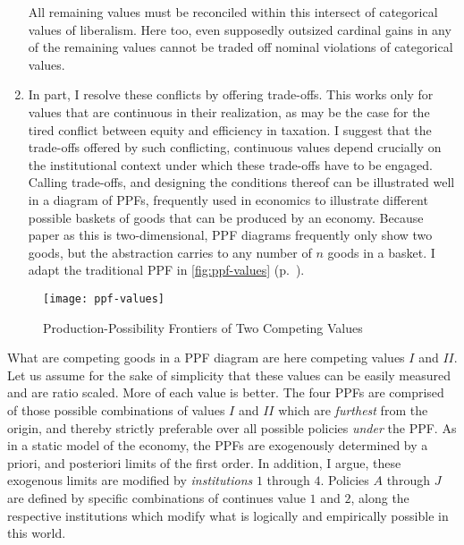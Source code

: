 \begin{enumerate}
		All remaining values must be reconciled within this intersect of categorical values of liberalism.
		Here too, even supposedly outsized cardinal gains in any of the remaining values cannot be traded off nominal violations of categorical values.
	\item
		In part, I resolve these conflicts by offering trade-offs.
		This works only for values that are continuous in their realization, as may be the case for the tired conflict between equity and efficiency in taxation. %
		I suggest that the trade-offs offered by such conflicting, continuous values depend crucially on the institutional context under which these trade-offs have to be engaged.
		Calling trade-offs, and designing the conditions thereof can be illustrated well in a diagram of \glspl{PPF}, frequently used in economics to illustrate different possible baskets of goods that can be produced by an economy. 
		Because paper as this is two-dimensional, \gls{PPF} diagrams frequently only show two goods, but the abstraction carries to any number of $n$ goods in a basket.
		I adapt the traditional \gls{PPF} in \autoref{fig:ppf-values} (p.~\pageref{fig:ppf-values}). 
\end{enumerate}

\begin{figure}[htbp]
	\centering
	\texttt{[image: ppf-values]}  
	\caption{Production-Possibility Frontiers of Two Competing Values}
	\label{fig:ppf-values}
\end{figure}%

	What are competing goods in a \gls{PPF} diagram are here competing values $I$ and $II$. 
	Let us assume for the sake of simplicity that these values can be easily measured and are ratio scaled.
	More of each value is better.
	The four \glspl{PPF} are comprised of those possible combinations of values $I$ and $II$ which are \emph{furthest} from the origin, and thereby strictly preferable over all possible policies \emph{under} the \gls{PPF}.
	As in a static model of the economy, the \glspl{PPF} are exogenously determined by a priori, and posteriori limits of the first order.
	In addition, I argue, these exogenous limits are modified by \emph{institutions} $1$ through $4$.
	 Policies $A$ through $J$ are defined by specific combinations of continues value $1$ and $2$, along the respective institutions which modify what is logically and empirically possible in this world.
	
